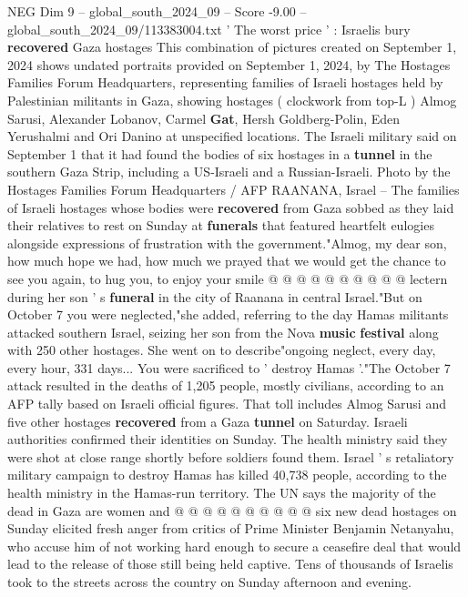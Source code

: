 \begin{textsample}{NEG Dim 9 – global\_south\_2024\_09 – Score -9.00 – global\_south\_2024\_09/113383004.txt}  \label{ex:f9_neg_106}
' The worst price ' : Israelis bury \textbf{recovered} Gaza hostages This combination of pictures created on September 1, 2024 shows undated portraits provided on September 1, 2024, by The Hostages Families Forum Headquarters, representing families of Israeli hostages held by Palestinian militants in Gaza, showing hostages ( clockwork from top-L ) Almog Sarusi, Alexander Lobanov, Carmel \textbf{Gat}, Hersh Goldberg-Polin, Eden Yerushalmi and Ori Danino at unspecified locations.
The Israeli military said on September 1 that it had found the bodies of six hostages in a \textbf{tunnel} in the southern Gaza Strip, including a US-Israeli and a Russian-Israeli.
Photo by the Hostages Families Forum Headquarters / AFP RAANANA, Israel -- The families of Israeli hostages whose bodies were \textbf{recovered} from Gaza sobbed as they laid their relatives to rest on Sunday at \textbf{funerals} that featured heartfelt eulogies alongside expressions of frustration with the government."Almog, my dear son, how much hope we had, how much we prayed that we would get the chance to see you again, to hug you, to enjoy your smile @ @ @ @ @ @ @ @ @ @ lectern during her son ' s \textbf{funeral} in the city of Raanana in central Israel."But on October 7 you were neglected,"she added, referring to the day Hamas militants attacked southern Israel, seizing her son from the Nova \textbf{music} \textbf{festival} along with 250 other hostages.
She went on to describe"ongoing neglect, every day, every hour, 331 days...
You were sacrificed to ' destroy Hamas '."The October 7 attack resulted in the deaths of 1,205 people, mostly civilians, according to an AFP tally based on Israeli official figures.
That toll includes Almog Sarusi and five other hostages \textbf{recovered} from a Gaza \textbf{tunnel} on Saturday.
Israeli authorities confirmed their identities on Sunday.
The health ministry said they were shot at close range shortly before soldiers found them.
Israel ' s retaliatory military campaign to destroy Hamas has killed 40,738 people, according to the health ministry in the Hamas-run territory.
The UN says the majority of the dead in Gaza are women and @ @ @ @ @ @ @ @ @ @ six new dead hostages on Sunday elicited fresh anger from critics of Prime Minister Benjamin Netanyahu, who accuse him of not working hard enough to secure a ceasefire deal that would lead to the release of those still being held captive.
Tens of thousands of Israelis took to the streets across the country on Sunday afternoon and evening.

\end{textsample}
